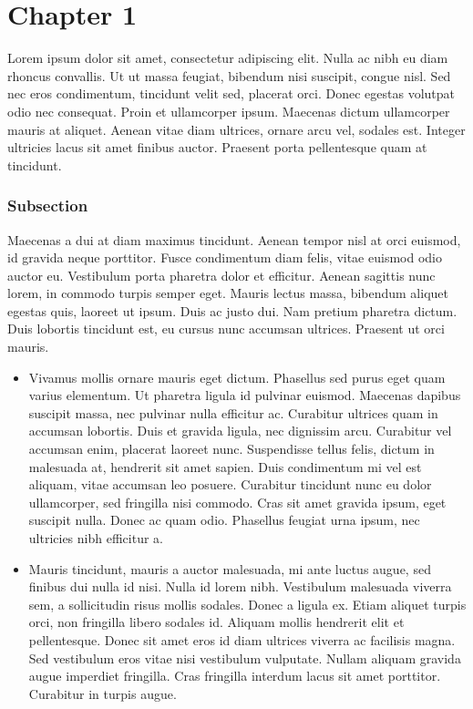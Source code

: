 \chapter*{Chapter 1}

\def\imgRoot{}

\setcounter{page}{1}
\pagestyle{fancy}

Lorem ipsum dolor sit amet, consectetur adipiscing elit. Nulla ac nibh eu diam rhoncus convallis. Ut ut massa feugiat, bibendum nisi suscipit, congue nisl. Sed nec eros condimentum, tincidunt velit sed, placerat orci. Donec egestas volutpat odio nec consequat. Proin et ullamcorper ipsum. Maecenas dictum ullamcorper mauris at aliquet. Aenean vitae diam ultrices, ornare arcu vel, sodales est. Integer ultricies lacus sit amet finibus auctor. Praesent porta pellentesque quam at tincidunt.

\subsection*{Subsection}

Maecenas a dui at diam maximus tincidunt. Aenean tempor nisl at orci euismod, id gravida neque porttitor. Fusce condimentum diam felis, vitae euismod odio auctor eu. Vestibulum porta pharetra dolor et efficitur. Aenean sagittis nunc lorem, in commodo turpis semper eget. Mauris lectus massa, bibendum aliquet egestas quis, laoreet ut ipsum. Duis ac justo dui. Nam pretium pharetra dictum. Duis lobortis tincidunt est, eu cursus nunc accumsan ultrices. Praesent ut orci mauris.  

\begin{itemize}
    \item Vivamus mollis ornare mauris eget dictum. Phasellus sed purus eget quam varius elementum. Ut pharetra ligula id pulvinar euismod. Maecenas dapibus suscipit massa, nec pulvinar nulla efficitur ac. Curabitur ultrices quam in accumsan lobortis. Duis et gravida ligula, nec dignissim arcu. Curabitur vel accumsan enim, placerat laoreet nunc. Suspendisse tellus felis, dictum in malesuada at, hendrerit sit amet sapien. Duis condimentum mi vel est aliquam, vitae accumsan leo posuere. Curabitur tincidunt nunc eu dolor ullamcorper, sed fringilla nisi commodo. Cras sit amet gravida ipsum, eget suscipit nulla. Donec ac quam odio. Phasellus feugiat urna ipsum, nec ultricies nibh efficitur a.  

    \item Mauris tincidunt, mauris a auctor malesuada, mi ante luctus augue, sed finibus dui nulla id nisi. Nulla id lorem nibh. Vestibulum malesuada viverra sem, a sollicitudin risus mollis sodales. Donec a ligula ex. Etiam aliquet turpis orci, non fringilla libero sodales id. Aliquam mollis hendrerit elit et pellentesque. Donec sit amet eros id diam ultrices viverra ac facilisis magna. Sed vestibulum eros vitae nisi vestibulum vulputate. Nullam aliquam gravida augue imperdiet fringilla. Cras fringilla interdum lacus sit amet porttitor. Curabitur in turpis augue. 
\end{itemize}

